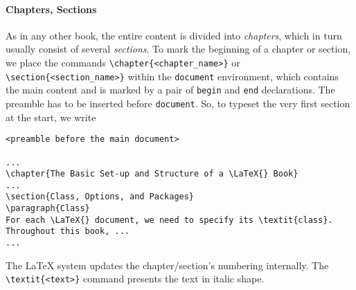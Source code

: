 \paragraph{Chapters, Sections} As in any other book, the entire content is divided into \textit{chapters}, which in turn usually consist of several \textit{sections}. To mark the beginning of a chapter or section, we place the commands \texttt{\textbackslash chapter\{<chapter\_name>\}} or \texttt{\textbackslash section\{<section\_name>\}} within the \verb|document| environment, which contains the main content and is marked by a pair of \verb|begin| and \verb|end| declarations. The preamble has to be inserted before \verb|document|. So, to typeset the very first section at the start, we write
\begin{lstlisting}
<preamble before the main document>

...
\chapter{The Basic Set-up and Structure of a \LaTeX{} Book}
...
\section{Class, Options, and Packages}
\paragraph{Class}
For each \LaTeX{} document, we need to specify its \textit{class}. Throughout this book, ...
...

\end{lstlisting}
The \LaTeX{} system updates the chapter/section's numbering internally. The \texttt{\textbackslash textit\{<text>\}} command presents the text in italic shape.

